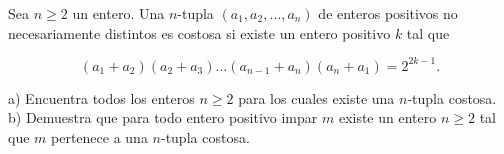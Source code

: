 Sea $n \ge 2$ un entero. Una $n$-tupla $(a_1, a_2, \dots , a_n)$ de enteros positivos no necesariamente distintos es costosa si existe un entero positivo $k$ tal que

\[(a_1+a_2)(a_2+a_3)\dots(a_{n-1}+a_n)(a_n+a_1)=2^{2k-1}.\]

a) Encuentra todos los enteros $n \geq 2$ para los cuales existe una $n$-tupla costosa.
b) Demuestra que para todo entero positivo impar $m$ existe un entero $n \geq 2$ tal que $m$ pertenece a
una $n$-tupla costosa.